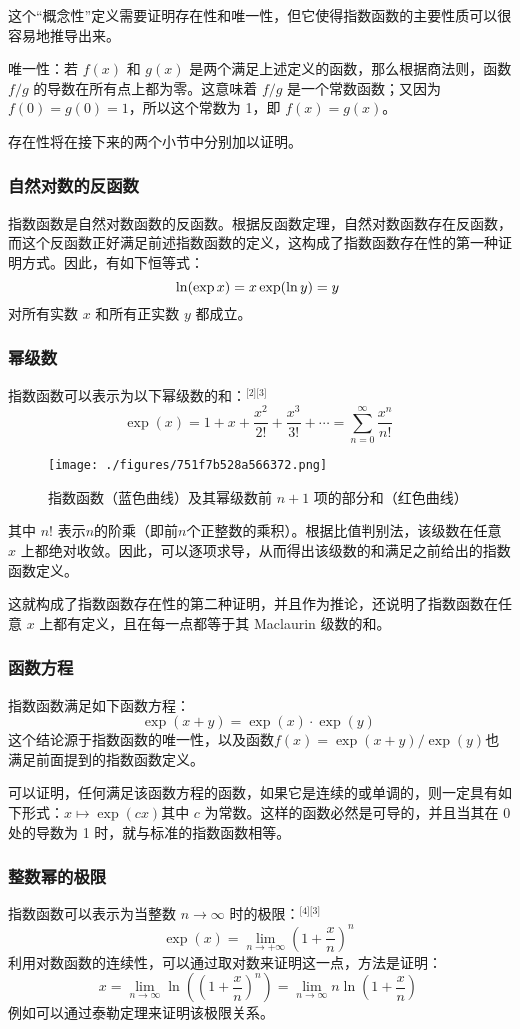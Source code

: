 这个“概念性”定义需要证明存在性和唯一性，但它使得指数函数的主要性质可以很容易地推导出来。

唯一性：若 $f(x)$ 和 $g(x)$ 是两个满足上述定义的函数，那么根据商法则，函数 $f/g$ 的导数在所有点上都为零。这意味着 $f/g$ 是一个常数函数；又因为 $f(0) = g(0) = 1$，所以这个常数为 1，即 $f(x) = g(x)$。

存在性将在接下来的两个小节中分别加以证明。
\subsubsection{自然对数的反函数}
指数函数是自然对数函数的反函数。根据反函数定理，自然对数函数存在反函数，而这个反函数正好满足前述指数函数的定义，这构成了指数函数存在性的第一种证明方式。因此，有如下恒等式：
$$
\ln(\exp x) = x \\
\exp(\ln y) = y~
$$
对所有实数 $x$ 和所有正实数 $y$ 都成立。
\subsubsection{幂级数}
指数函数可以表示为以下幂级数的和：\(^\text{[2][3]}\)
$$
\exp(x) = 1 + x + \frac{x^2}{2!} + \frac{x^3}{3!} + \cdots = \sum_{n=0}^{\infty} \frac{x^n}{n!}~
$$
\begin{figure}[ht]
\centering
\texttt{[image: ./figures/751f7b528a566372.png]}
\caption{指数函数（蓝色曲线）及其幂级数前 $n + 1$ 项的部分和（红色曲线）} \label{fig_ZShs_2}
\end{figure}
其中 $n!$ 表示$n$的阶乘（即前$n$个正整数的乘积）。根据比值判别法，该级数在任意 $x$ 上都绝对收敛。因此，可以逐项求导，从而得出该级数的和满足之前给出的指数函数定义。

这就构成了指数函数存在性的第二种证明，并且作为推论，还说明了指数函数在任意 $x$ 上都有定义，且在每一点都等于其 Maclaurin 级数的和。
\subsubsection{函数方程}
指数函数满足如下函数方程：
$$
\exp(x + y) = \exp(x) \cdot \exp(y)~
$$
这个结论源于指数函数的唯一性，以及函数$f(x) = \exp(x + y)/\exp(y)$也满足前面提到的指数函数定义。

可以证明，任何满足该函数方程的函数，如果它是连续的或单调的，则一定具有如下形式：$x \mapsto \exp(c x)$其中 $c$ 为常数。这样的函数必然是可导的，并且当其在 0 处的导数为 1 时，就与标准的指数函数相等。
\subsubsection{整数幂的极限}
指数函数可以表示为当整数 $n \to \infty$ 时的极限：\(^\text{[4][3]}\)
$$
\exp(x) = \lim_{n \to +\infty} \left(1 + \frac{x}{n}\right)^n~
$$
利用对数函数的连续性，可以通过取对数来证明这一点，方法是证明：
$$
x = \lim_{n \to \infty} \ln\left( \left(1 + \frac{x}{n} \right)^n \right) = \lim_{n \to \infty} n \ln\left(1 + \frac{x}{n} \right)~
$$
例如可以通过泰勒定理来证明该极限关系。
